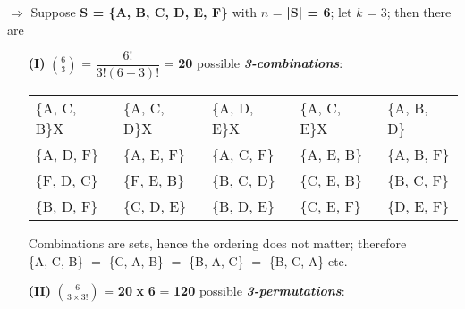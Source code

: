 \documentclass[output=paper,colorlinks,citecolor=brown,draft]{langscibook}
\begin{document}
\noindent $\Rightarrow$  Suppose \textbf{S  =  \{A, B, C, D, E, F\}} with  $n$ = \textbf{|S| = 6}; let $k$ = 3; then there are


\begin{enumerate}
\item[\textbf{(I)}]     ${6}\choose{3}$ =   {\footnotesize$\dfrac{ 6! }{ 3!(6-3)! } $} = \textbf{20} possible  \textit{\textbf{3-combinations}}: 


 \begin{tabularx}{.765\textwidth}{l l l l l}
	\{A, C, B\}{\color{white}X} & \{A, C, D\}{\color{white}X} & \{A, D, E\}{\color{white}X} & \{A, C, E\}{\color{white}X} & \{A, B, D\} \\
	\{A, D, F\} 	&	\{A, E, F\} &	\{A, C, F\} &	\{A, E, B\} 	&	\{A, B, F\} \\ 
	\{F, D, C\} 	&	\{F, E, B\} 	&	\{B, C, D\} &	\{C, E, B\} &	\{B, C, F\} \\ 
	\{B, D, F\} 	&	\{C, D,  E\} 	&	\{B, D, E\} &	\{C, E, F\} &	\{D, E, F\} \\  
 \end{tabularx}


Combinations are sets, hence the ordering does not matter; therefore \\   \{A, C, B\} $=$ \{C, A, B\} $=$ \{B, A, C\} $=$ \{B, C, A\} etc. \\  %

\item[\textbf{(II)}]${6}\choose{3} \times 3!$ =  \textbf{20}  {\small \textbf{x}} \textbf{6}  = \textbf{120}  possible \textit{\textbf{3-permutations}}: %


\end{enumerate}
\end{document}
